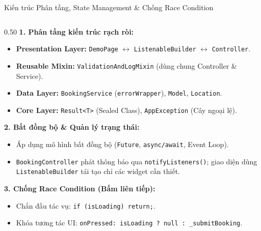 \documentclass[aspectratio=169, 10pt]{beamer}
\begin{document}
\begin{frame}{Kiến trúc Phân tầng, State Management \& Chống Race Condition}
  \vspace{-0.35cm}
  \begin{columns}[c,onlytextwidth]
    \begin{column}{0.50\textwidth}
      \scriptsize
      \textbf{1. Phân tầng kiến trúc rạch ròi:}
      \begin{itemize}
        \setlength{\itemsep}{1pt}
        \item \textbf{Presentation Layer:} \texttt{DemoPage} $\leftrightarrow$ \texttt{ListenableBuilder} $\leftrightarrow$ \texttt{Controller}.
        \item \textbf{Reusable Mixin:} \texttt{ValidationAndLogMixin} (dùng chung Controller \& Service).
        \item \textbf{Data Layer:} \texttt{BookingService} (\texttt{errorWrapper}), \texttt{Model}, \texttt{Location}.
        \item \textbf{Core Layer:} \texttt{Result<T>} (Sealed Class), \texttt{AppException} (Cây ngoại lệ).
      \end{itemize}

      \vspace{0.04cm}
      \textbf{2. Bất đồng bộ \& Quản lý trạng thái:}
      \begin{itemize}
        \setlength{\itemsep}{1pt}
        \item Áp dụng mô hình bất đồng bộ (\texttt{Future}, \texttt{async/await}, Event Loop).
        \item \texttt{BookingController} phát thông báo qua \texttt{notifyListeners()}; giao diện dùng \texttt{ListenableBuilder} tái tạo chỉ các widget cần thiết.
      \end{itemize}

      \vspace{0.04cm}
      \textbf{3. Chống Race Condition (Bấm liên tiếp):}
      \begin{itemize}
        \setlength{\itemsep}{1pt}
        \item Chắn đầu tác vụ: \texttt{if (isLoading) return;}.
        \item Khóa tương tác UI: \texttt{onPressed: isLoading ? null : \_submitBooking}.
      \end{itemize}
    \end{column}


\end{columns}
\end{frame}
\end{document}
